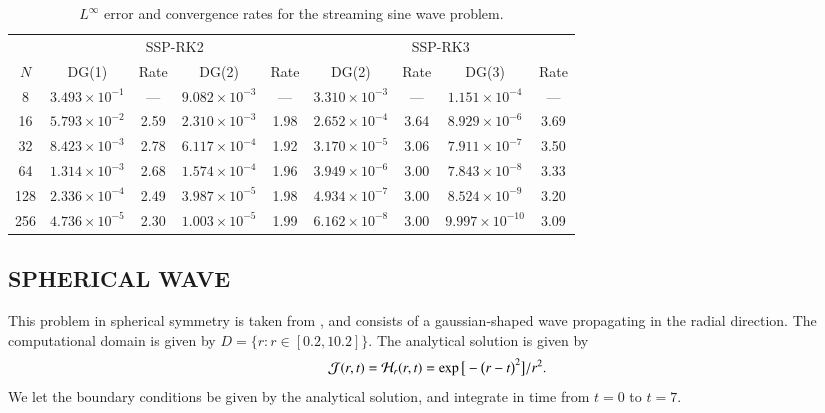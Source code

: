 \documentclass[11pt,letterpaper,twoside,english,final]{article}
\begin{document}
\begin{table}[h]
  \caption{$L^{\infty}$ error and convergence rates for the streaming sine wave problem.}
  \small
  \vspace{-6pt}
  \begin{center}
  \label{tab:streamingSineWave}
  \begin{tabular}{ccccccccc}
    & \multicolumn{4}{c}{SSP-RK2} & \multicolumn{4}{c}{SSP-RK3} \\
    \cmidrule(r){2-5} \cmidrule(r){6-9}
    $N$ & DG(1) & Rate & DG(2) & Rate & DG(2) & Rate & DG(3) & Rate \\
    \midrule \midrule
    8     & $3.493\times10^{-1}$ & ---  & $9.082\times10^{-3}$ & ---  & $3.310\times10^{-3}$ & ---  & $1.151\times10^{-4}$  & --- \\
    16   & $5.793\times10^{-2}$ &2.59& $2.310\times10^{-3}$ &1.98& $2.652\times10^{-4}$ &3.64& $8.929\times10^{-6}$ &3.69 \\
    32   & $8.423\times10^{-3}$ &2.78& $6.117\times10^{-4}$ &1.92& $3.170\times10^{-5}$ &3.06& $7.911\times10^{-7}$ &3.50 \\
    64   & $1.314\times10^{-3}$ &2.68& $1.574\times10^{-4}$ &1.96& $3.949\times10^{-6}$ &3.00& $7.843\times10^{-8}$ &3.33 \\
    128 & $2.336\times10^{-4}$ &2.49& $3.987\times10^{-5}$ &1.98& $4.934\times10^{-7}$ &3.00& $8.524\times10^{-9}$ &3.20 \\
    256 & $4.736\times10^{-5}$ &2.30& $1.003\times10^{-5}$ &1.99& $6.162\times10^{-8}$ &3.00& $9.997\times10^{-10}$ &3.09 \\
    \midrule \midrule
  \end{tabular}
  \end{center}
\end{table}

\subsection{SPHERICAL WAVE}

This problem in spherical symmetry is taken from \citet{pons_etal_2000}, and consists of a gaussian-shaped wave propagating in the radial direction.  
The computational domain is given by $D=\{r:r\in[0.2,10.2]\}$.  
The analytical solution is given by
\begin{equation}
  \mathcal{J}(r,t)=\mathcal{H}_{r}(r,t)
  =\exp\big[-\big(r-t\big)^{2}\big]/r^{2}.  
\end{equation}
We let the boundary conditions be given by the analytical solution, and integrate in time from $t=0$ to $t=7$.  
\end{document}
